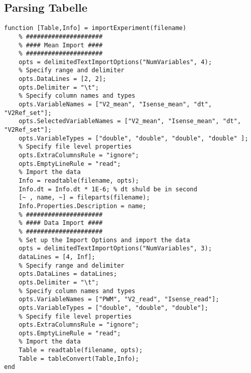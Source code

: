 \subsection{Parsing Tabelle} \label{subsec:tabParsing}
\begin{lstlisting}[style=matlabStyle,caption={Parsing delle tabelle},label=lst:tabParsing] 
function [Table,Info] = importExperiment(filename)
	% #####################
	% #### Mean Import ####
	% #####################
	opts = delimitedTextImportOptions("NumVariables", 4);
	% Specify range and delimiter
	opts.DataLines = [2, 2];
	opts.Delimiter = "\t";
	% Specify column names and types
	opts.VariableNames = ["V2_mean", "Isense_mean", "dt", "V2Ref_set"];
	opts.SelectedVariableNames = ["V2_mean", "Isense_mean", "dt", "V2Ref_set"];
	opts.VariableTypes = ["double", "double", "double", "double" ];
	% Specify file level properties
	opts.ExtraColumnsRule = "ignore";
	opts.EmptyLineRule = "read";	
	% Import the data
	Info = readtable(filename, opts);
	Info.dt = Info.dt * 1E-6; % dt shuld be in second
	[~ , name, ~] = fileparts(filename);
	Info.Properties.Description = name;	
	% #####################
	% #### Data Import ####
	% #####################
	% Set up the Import Options and import the data
	opts = delimitedTextImportOptions("NumVariables", 3);
	dataLines = [4, Inf];
	% Specify range and delimiter
	opts.DataLines = dataLines;
	opts.Delimiter = "\t";
	% Specify column names and types
	opts.VariableNames = ["PWM", "V2_read", "Isense_read"];
	opts.VariableTypes = ["double", "double", "double"];
	% Specify file level properties
	opts.ExtraColumnsRule = "ignore";
	opts.EmptyLineRule = "read";
	% Import the data
	Table = readtable(filename, opts);
	Table = tableConvert(Table,Info);
end
\end{lstlisting}
\newpage
